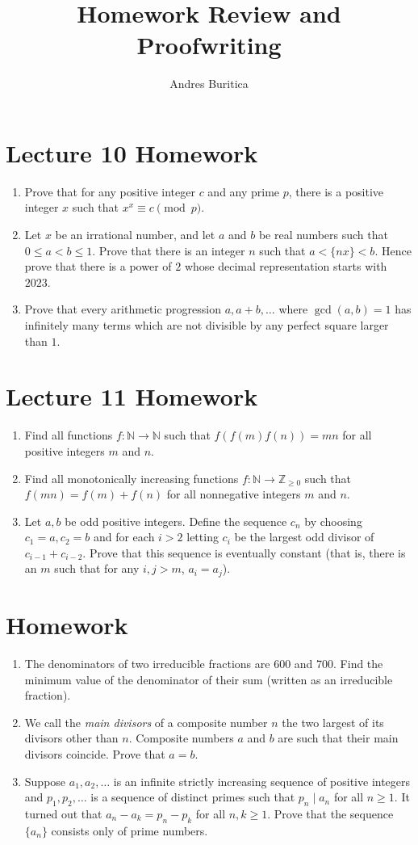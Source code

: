 \documentclass{article}
\title{Homework Review and Proofwriting}
\author{Andres Buritica}
\date{}
\newcommand\Nn{\mathbb{N}}
\newcommand\Zz{\mathbb{Z}}
\begin{document}
\maketitle
\section{Lecture 10 Homework}
\begin{enumerate}
  \item Prove that for any positive integer $c$ and any prime $p$, there is a
    positive integer $x$ such that $x^x\equiv c\pmod p$.
  \item Let $x$ be an irrational number, and let $a$ and $b$ be real numbers
    such that $0\le a<b\le 1$. Prove that there is an integer $n$ such that
    $a<\{nx\}<b$. Hence prove that there is a power of $2$ whose decimal
    representation starts with $2023$.
  \item Prove that every arithmetic progression $a,a+b,\ldots$ where
    $\gcd(a,b)=1$ has infinitely many terms which are not divisible by any
    perfect square larger than $1$.
\end{enumerate}

\section{Lecture 11 Homework}
\begin{enumerate}
  \item Find all functions $f:\Nn\to\Nn$ such that $f(f(m)f(n))=mn$ for all
    positive integers $m$ and $n$.
  \item Find all monotonically increasing functions $f:\Nn\to\Zz_{\ge 0}$ such that $f(mn)=f(m)+f(n)$ for
    all nonnegative integers $m$ and $n$.
  \item Let $a,b$ be odd positive integers. Define the sequence $c_n$ by
    choosing $c_1=a,c_2=b$ and for each $i>2$ letting $c_i$ be the largest odd
    divisor of $c_{i-1}+c_{i-2}$. Prove that this sequence is eventually
    constant
    (that is, there is an $m$ such that for any $i,j>m$, $a_i=a_j$).
\end{enumerate}
\newpage
\section{Homework}
\begin{enumerate}
  \item The denominators of two irreducible fractions are 600 and 700. Find the
    minimum value of the denominator of their sum (written as an irreducible
    fraction).
  \item We call the \emph{main divisors} of a composite number $n$ the two
    largest of its divisors other than $n$. Composite numbers $a$ and $b$ are
    such that their main divisors coincide. Prove that $a=b$.
  \item Suppose $a_1,a_2, \dots$ is an infinite strictly increasing sequence of
    positive integers and $p_1, p_2, \dots$ is a sequence of distinct primes
    such that $p_n \mid a_n$ for all $n \ge 1$. It turned out that
    $a_n-a_k=p_n-p_k$ for all $n,k \ge 1$. Prove that the sequence $\{a_n\}$
    consists only of prime numbers.
\end{enumerate}
\end{document}
